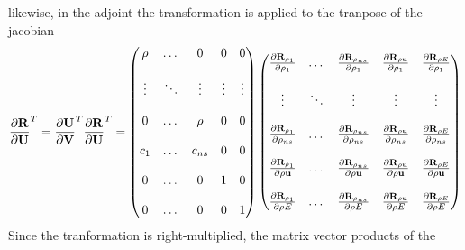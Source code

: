 \documentclass[a4paper]{report}
\begin{document}
likewise, in the adjoint the transformation is applied to the tranpose of the 
jacobian
\begin{equation}
  \begin{aligned}
    \frac{\partial \mathbf R}{\partial \mathbf U}^{T} = \frac{\partial \mathbf U}{\partial \mathbf V}^{T} \frac{\partial \mathbf R}{\partial \mathbf U}^{T} =
    \begin{pmatrix}
      \rho   & \dots  & 0      &  0      & 0      \\ \\
      \vdots & \ddots & \vdots &  \vdots & \vdots \\ \\
      0      & \dots  &\rho    &  0      & 0      \\ \\
      c_1    & \dots  & c_{ns} &  0      & 0      \\ \\
      0      & \dots  & 0      &  1      & 0      \\ \\
      0      & \dots  & 0      &  0      & 1
    \end{pmatrix}
    \begin{pmatrix}
      \frac{\partial \mathbf R_{\rho_1}}{\partial \rho_1}    & \dots  & \frac{\partial \mathbf R_{\rho_{ns}}}{\partial \rho_1}    & \frac{\partial \mathbf R_{\rho \mathbf u}}{\partial \rho_1}    & \frac{\partial \mathbf R_{\rho E}}{\partial \rho_1} \\ \\
      \vdots                    & \ddots & \vdots                       & \vdots                      & \vdots                   \\ \\
      \frac{\partial \mathbf R_{\rho_1}}{\partial \rho_{ns}} & \dots  & \frac{\partial \mathbf R_{\rho_{ns}}}{\partial \rho_{ns}} & \frac{\partial \mathbf R_{\rho \mathbf u}}{\partial \rho_{ns}} & \frac{\partial \mathbf R_{\rho E}}{\partial \rho_{ns}} \\ \\
      \frac{\partial \mathbf R_{\rho_1}}{\partial \rho \mathbf u}  & \dots  & \frac{\partial \mathbf R_{\rho_{ns}}}{\partial \rho \mathbf u}  & \frac{\partial \mathbf R_{\rho \mathbf u}}{\partial \rho \mathbf u}  & \frac{\partial \mathbf R_{\rho E}}{\partial \rho \mathbf u} \\ \\
      \frac{\partial \mathbf R_{\rho_1}}{\partial \rho E}    & \dots  & \frac{\partial \mathbf R_{\rho_{ns}}}{\partial \rho E}    & \frac{\partial \mathbf R_{\rho \mathbf u}}{\partial \rho E}    & \frac{\partial \mathbf R_{\rho E}}{\partial \rho E}
    \end{pmatrix}
  \end{aligned}
  \label{drdu-to-drdv-t}
\end{equation}
Since the tranformation is right-multiplied, the matrix vector products of the 
\end{document}
